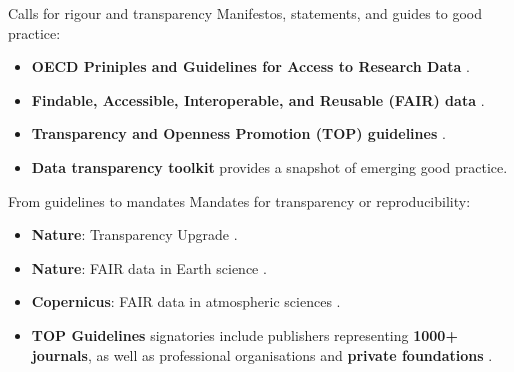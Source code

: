 \documentclass[aspectratio=169, 11pt]{beamer} %
\begin{document}
\begin{frame}{Calls for rigour and transparency}
  Manifestos, statements, and guides to good practice:
    \begin{itemize}[label=\textbullet]
        \item \textbf{OECD Priniples and Guidelines for Access to Research Data} \cite{Oecd2007-vi}.
        \item \textbf{Findable, Accessible, Interoperable, and Reusable (FAIR) data} \cite{Wilkinson2016-mr, Go-fair2017-vs}.
        \item \textbf{Transparency and Openness Promotion (TOP) guidelines} \cite{Nosek2015-wm, Cos2019-mr}.
        \item \textbf{Data transparency toolkit} \cite{Perkel2018-rw} provides a snapshot of emerging good practice.
    \end{itemize}
\end{frame}

\begin{frame}{From guidelines to mandates}
  Mandates for transparency or reproducibility:
    \begin{itemize}[label=\textbullet]
        \item \textbf{Nature}: Transparency Upgrade \cite{Nature2017-lq}.
        \item \textbf{Nature}: FAIR data in Earth science \cite{Nature2019-ng}.
        \item \textbf{Copernicus}: FAIR data in atmospheric sciences \cite{Van_Edig2018-bu}.
        \item \textbf{TOP Guidelines} signatories include publishers representing \textbf{1000+ journals}, as well as professional organisations and \textbf{private foundations}  \cite{Cos2019-mr}.
    \end{itemize}
\end{frame}

\end{document}
